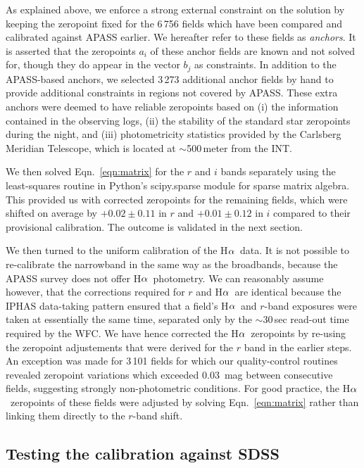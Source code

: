 \documentclass[useAMS,usenatbib]{mn2e}
\def\ha{\mbox{H$\rm \alpha$}}
\begin{document}
As explained above, we enforce a strong external constraint
on the solution by keeping the zeropoint fixed 
for the 6\,756 fields which have been compared
and calibrated against APASS earlier.
We hereafter refer to these fields as \emph{anchors}.
It is asserted that the zeropoints $a_i$ of these anchor fields 
are known and not solved for,
though they do appear in the vector $b_j$ as constraints.
In addition to the APASS-based anchors, 
we selected 3\,273 additional anchor fields by hand
to provide additional constraints in regions not covered by APASS.
These extra anchors were deemed to have reliable zeropoints 
based on 
(i) the information contained in the observing logs,
(ii) the stability of the standard star zeropoints during the night, and
(iii) photometricity statistics provided by the Carlsberg Meridian Telescope,
which is located at $\sim$500\,meter from the INT.

We then solved Eqn.~\ref{eqn:matrix} for the $r$ and $i$ bands
separately using the least-squares routine 
in Python's {\sc scipy.sparse} module for sparse matrix algebra.
This provided us with corrected zeropoints for the remaining fields,
which were shifted on average by $+0.02\pm0.11$ in $r$ 
and $+0.01\pm0.12$ in $i$ compared to their provisional calibration.
The outcome is validated in the next section.

We then turned to the uniform calibration of the \ha\ data.
It is not possible to re-calibrate the narrowband 
in the same way as the broadbands,
because the APASS survey does not offer \ha\ photometry.
We can reasonably assume however,
that the corrections required for $r$ and \ha\ are identical
because the IPHAS data-taking pattern ensured 
that a field's \ha\ and $r$-band exposures
were taken at essentially the same time, 
separated only by the $\sim$30\,sec read-out time required by the WFC.
We have hence corrected the \ha\ zeropoints 
by re-using the zeropoint adjustements that were derived for the $r$ band
in the earlier steps.
An exception was made for 3\,101 fields
for which our quality-control routines revealed
zeropoint variations which exceeded 0.03~mag 
between consecutive fields,
suggesting strongly non-photometric conditions.
For good practice, the \ha\ zeropoints of these fields
were adjusted by solving Eqn.~\ref{eqn:matrix}
rather than linking them directly to the $r$-band shift.

\subsection{Testing the calibration against SDSS}
\end{document}
